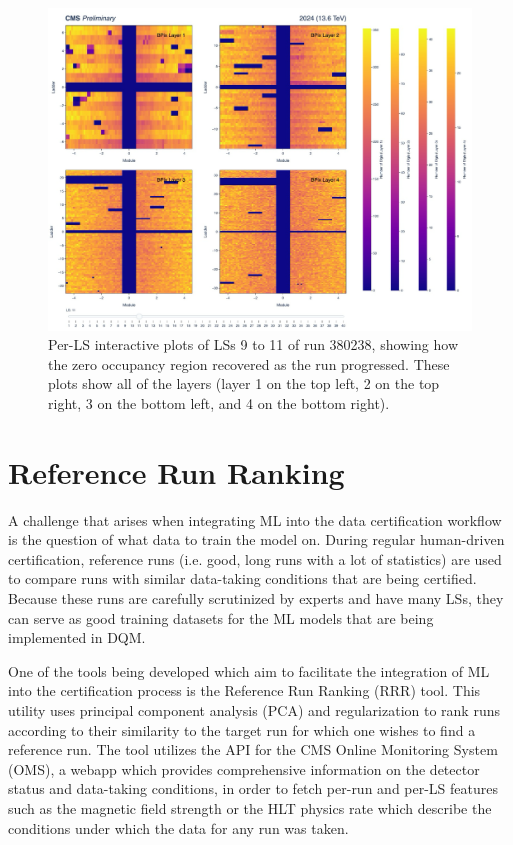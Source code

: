 \begin{figure}[H]
\begin{minipage}{0.48\textwidth}
    \includegraphics[width=\linewidth]{images/ls11.png}
  \end{minipage}
  \caption{Per-LS interactive plots of LSs 9 to 11 of run 380238, showing how the zero occupancy region recovered as the run progressed. These plots show all of the layers (layer 1 on the top left, 2 on the top right, 3 on the bottom left, and 4 on the bottom right).}
  \label{fig:380238lss}
\end{figure}

\section{Reference Run Ranking}

A challenge that arises when integrating ML into the data certification workflow is the question of what data to train the model on. During regular human-driven certification, reference runs (i.e. good, long runs with a lot of statistics) are used to compare runs with similar data-taking conditions that are being certified. Because these runs are carefully scrutinized by experts and have many LSs, they can serve as good training datasets for the ML models that are being implemented in DQM. 

One of the tools being developed which aim to facilitate the integration of ML into the certification process is the Reference Run Ranking (RRR) tool. This utility uses principal component analysis (PCA) and regularization to rank runs according to their similarity to the target run for which one wishes to find a reference run. The tool utilizes the API for the CMS Online Monitoring System (OMS), a webapp which provides comprehensive information on the detector status and data-taking conditions, in order to fetch per-run and per-LS features such as the magnetic field strength or the HLT physics rate which describe the conditions under which the data for any run was taken.

